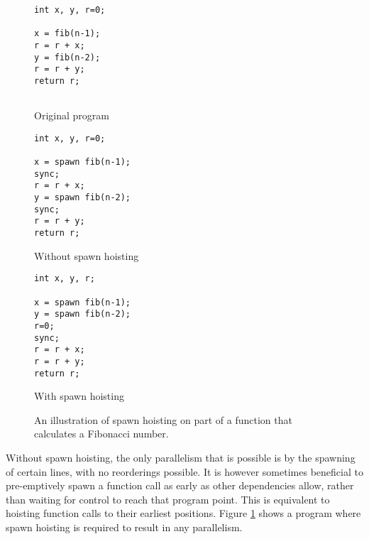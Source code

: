 \begin{figure}
  \centering
  \begin{subfloat}
    \begin{minipage}{0.6in}
      \begin{verbatim}
int x, y, r=0;

x = fib(n-1);
r = r + x;
y = fib(n-2);
r = r + y;
return r;


      \end{verbatim}
    \end{minipage}%
    \label{orig}
    \caption{Original program}
  \end{subfloat}%
  \qquad
  \begin{subfloat}
    \begin{minipage}{0.9in}
      \begin{verbatim}
int x, y, r=0;

x = spawn fib(n-1);
sync;
r = r + x;
y = spawn fib(n-2);
sync;
r = r + y;
return r;
      \end{verbatim}
    \end{minipage}%
    \label{without}
    \caption{Without spawn hoisting}
  \end{subfloat}%
  \qquad
  \begin{subfloat}
    \begin{minipage}{0.9in}
      \begin{verbatim}
int x, y, r;

x = spawn fib(n-1);
y = spawn fib(n-2);
r=0;
sync;
r = r + x;
r = r + y;
return r;
      \end{verbatim}
    \end{minipage}%
    \label{with}
    \caption{With spawn hoisting}
  \end{subfloat}%
  \caption{An illustration of spawn hoisting on part of a function that calculates a Fibonacci number.}
  \label{spawn}
\end{figure}

Without spawn hoisting, the only parallelism that is possible is by the spawning of certain lines, with no reorderings possible.
It is however sometimes beneficial to pre-emptively spawn a function call as early as other dependencies allow, rather than waiting for control to reach that program point.
This is equivalent to hoisting function calls to their earliest positions.
Figure \ref{spawn} shows a program where spawn hoisting is required to result in any parallelism.

